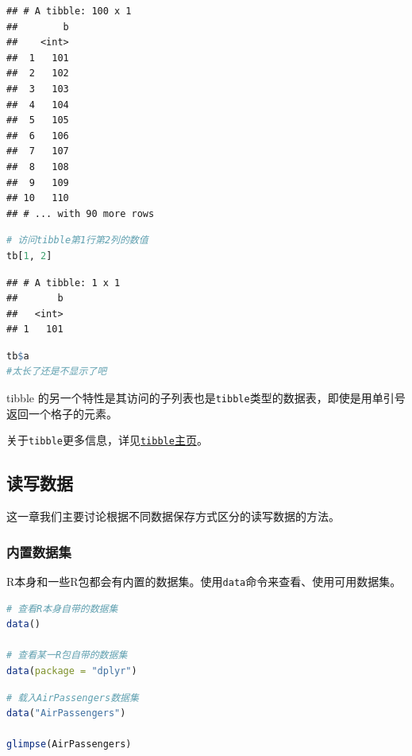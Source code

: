 \documentclass[]{ctexbook}
\newcommand{\passthrough}[1]{#1}
\begin{document}
\begin{lstlisting}
## # A tibble: 100 x 1
##        b
##    <int>
##  1   101
##  2   102
##  3   103
##  4   104
##  5   105
##  6   106
##  7   107
##  8   108
##  9   109
## 10   110
## # ... with 90 more rows
\end{lstlisting}

\begin{lstlisting}[language=R]
# 访问tibble第1行第2列的数值
tb[1, 2]
\end{lstlisting}

\begin{lstlisting}
## # A tibble: 1 x 1
##       b
##   <int>
## 1   101
\end{lstlisting}

\begin{lstlisting}[language=R]
tb$a
#太长了还是不显示了吧
\end{lstlisting}

tibble 的另一个特性是其访问的子列表也是\passthrough{\lstinline!tibble!}类型的数据表，即使是用单引号返回一个格子的元素。

关于\passthrough{\lstinline!tibble!}更多信息，详见\href{https://tibble.tidyverse.org/}{\passthrough{\lstinline!tibble!}主页}。

\hypertarget{ux8bfbux5199ux6570ux636e}{%
\subsection{读写数据}\label{ux8bfbux5199ux6570ux636e}}

这一章我们主要讨论根据不同数据保存方式区分的读写数据的方法。

\hypertarget{ux5185ux7f6eux6570ux636eux96c6}{%
\subsubsection{内置数据集}\label{ux5185ux7f6eux6570ux636eux96c6}}

R本身和一些R包都会有内置的数据集。使用\passthrough{\lstinline!data!}命令来查看、使用可用数据集。

\begin{lstlisting}[language=R]
# 查看R本身自带的数据集
data()

# 查看某一R包自带的数据集
data(package = "dplyr")
\end{lstlisting}

\begin{lstlisting}[language=R]
# 载入AirPassengers数据集
data("AirPassengers")

glimpse(AirPassengers)
\end{lstlisting}
\end{document}
